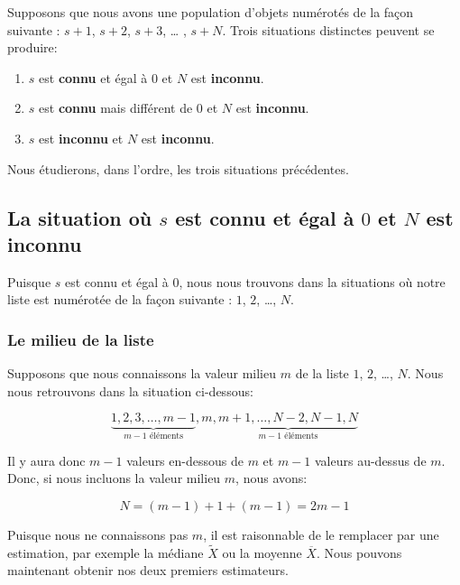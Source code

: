 \documentclass[10pt]{article}
\begin{document}
Supposons que nous avons une population d'objets numérotés de la façon
suivante : \(s+1\), \(s+2\), \(s+3\), \ldots{} , \(s+N\). Trois
situations distinctes peuvent se produire:

\begin{enumerate}
\def\labelenumi{\arabic{enumi}.}
\item
  \(s\) est \textbf{connu} et égal à \(0\) et \(N\) est
  \textbf{inconnu}.
\item
  \(s\) est \textbf{connu} mais différent de \(0\) et \(N\) est
  \textbf{inconnu}.
\item
  \(s\) est \textbf{inconnu} et \(N\) est \textbf{inconnu}.
\end{enumerate}

Nous étudierons, dans l'ordre, les trois situations précédentes.

\subsection{\texorpdfstring{La situation où \(s\) est \textbf{connu} et
égal à \(0\) et \(N\) est
\textbf{inconnu}}{La situation où s est connu et égal à 0 et N est inconnu}}\label{la-situation-ou-s-est-connu-et-egal-a-0-et-n-est-inconnu}

Puisque \(s\) est connu et égal à \(0\), nous nous trouvons dans la
situations où notre liste est numérotée de la façon suivante : \(1\),
\(2\), \ldots{}, \(N\).

\subsubsection{Le milieu de la liste}\label{le-milieu-de-la-liste}

Supposons que nous connaissons la valeur milieu \(m\) de la liste \(1\),
\(2\), \ldots{}, \(N\). Nous nous retrouvons dans la situation
ci-dessous:

\[\underbrace{1,2,3,\ldots,m-1}_{m-1 \text{ éléments}},m,\underbrace{m+1,\ldots,N-2,N-1,N}_{m-1 \text{ éléments}}\]

Il y aura donc \(m-1\) valeurs en-dessous de \(m\) et \(m-1\) valeurs
au-dessus de \(m\). Donc, si nous incluons la valeur milieu \(m\), nous
avons:

\[N=(m-1)+1+(m-1)=2m-1\]

Puisque nous ne connaissons pas \(m\), il est raisonnable de le
remplacer par une estimation, par exemple la médiane \(\widetilde{X}\)
ou la moyenne \(\overline{X}\). Nous pouvons maintenant obtenir nos deux
premiers estimateurs.
\end{document}

